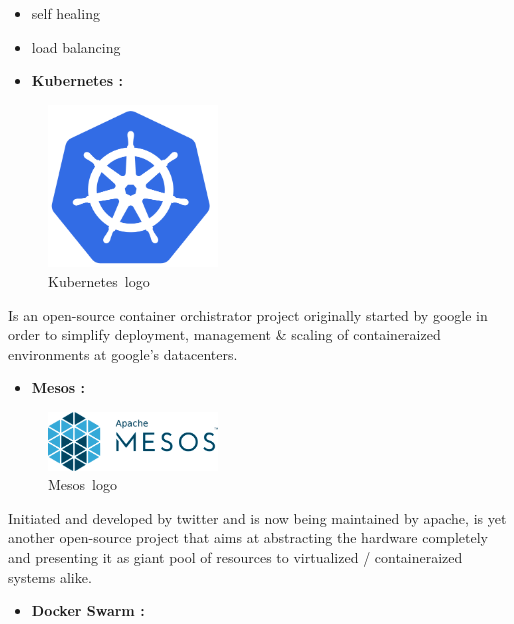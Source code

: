 \documentclass[
  14pt,
  english,
  a4paper,
]{scrreprt}
\providecommand{\tightlist}{%
  \setlength{\itemsep}{0pt}\setlength{\parskip}{0pt}}
\begin{document}
\begin{itemize}
\item
  self healing
\item
  load balancing
\item
  \textbf{Kubernetes :}
\end{itemize}

\begin{figure}
\hypertarget{fig:kublogo}{%
\centering
\includegraphics[width=0.4\textwidth,height=\textheight]{figures/kubernetes-text-logo.png}
\caption{Kubernetes~logo}\label{fig:kublogo}
}
\end{figure}

Is an open-source container orchistrator project originally started by
google in order to simplify deployment, management \& scaling of
containeraized environments at google's datacenters.

\begin{itemize}
\tightlist
\item
  \textbf{Mesos :}
\end{itemize}

\begin{figure}
\hypertarget{fig:meslogo}{%
\centering
\includegraphics[width=0.4\textwidth,height=\textheight]{figures/Apache-mesos-text-logo.png}
\caption{Mesos~logo}\label{fig:meslogo}
}
\end{figure}

Initiated and developed by twitter and is now being maintained by
apache, is yet another open-source project that aims at abstracting the
hardware completely and presenting it as giant pool of resources to
virtualized / containeraized systems alike.

\begin{itemize}
\tightlist
\item
  \textbf{Docker Swarm :}
\end{itemize}
\end{document}
